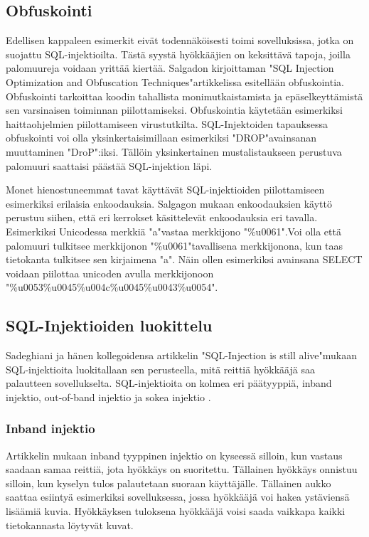 \documentclass[finnish]{tktltiki2}
\theoremstyle{definition}
\theoremstyle{remark}
\begin{document}
	\subsection{Obfuskointi}
	
	Edellisen kappaleen esimerkit eivät todennäköisesti toimi sovelluksissa, jotka on suojattu SQL-injektioilta. Tästä syystä hyökkääjien on keksittävä tapoja, joilla palomuureja voidaan yrittää kiertää. Salgadon kirjoittaman "SQL Injection Optimization and Obfuscation Techniques"\cite{encoding}\space artikkelissa esitellään obfuskointia. Obfuskointi tarkoittaa koodin tahallista monimutkaistamista ja epäselkeyttämistä sen varsinaisen toiminnan piilottamiseksi. Obfuskointia käytetään esimerkiksi haittaohjelmien piilottamiseen virustutkilta. SQL-Injektoiden tapauksessa obfuskointi voi olla yksinkertaisimillaan esimerkiksi "DROP"\space avainsanan muuttaminen "DroP":iksi. Tällöin yksinkertainen mustalistaukseen perustuva palomuuri saattaisi päästää SQL-injektion läpi.
	
	Monet hienostuneemmat tavat käyttävät SQL-injektioiden piilottamiseen esimerkiksi erilaisia enkoodauksia. Salgagon mukaan enkoodauksien käyttö perustuu siihen, että eri kerrokset käsittelevät enkoodauksia eri tavalla. Esimerkiksi Unicodessa merkkiä "a"\space vastaa merkkijono "\%u0061".\space Voi olla että palomuuri tulkitsee merkkijonon "\%u0061"\space tavallisena merkkijonona, kun taas tietokanta tulkitsee sen kirjaimena "a". Näin ollen esimerkiksi avainsana SELECT voidaan piilottaa unicoden avulla merkkijonoon "\%u0053\%u0045\%u004c\%u0045\%u0043\%u0054".
	
	\subsection{SQL-Injektioiden luokittelu}
		Sadeghiani ja hänen kollegoidensa artikkelin "SQL-Injection is still alive"\space mukaan SQL-injektioita luokitallaan sen perusteella, mitä reittiä hyökkääjä saa palautteen sovellukselta. SQL-injektioita on kolmea eri päätyyppiä, inband injektio, out-of-band injektio ja sokea injektio \cite{still-alive}.
	
	\subsubsection{Inband injektio}
	Artikkelin mukaan inband tyyppinen injektio on kyseessä silloin, kun vastaus saadaan samaa reittiä, jota hyökkäys on suoritettu. Tällainen hyökkäys onnistuu silloin, kun kyselyn tulos palautetaan suoraan käyttäjälle. Tällainen aukko saattaa esiintyä esimerkiksi sovelluksessa, jossa hyökkääjä voi hakea ystäviensä lisäämiä kuvia. Hyökkäyksen tuloksena hyökkääjä voisi saada vaikkapa kaikki tietokannasta löytyvät kuvat.
	
\end{document}
